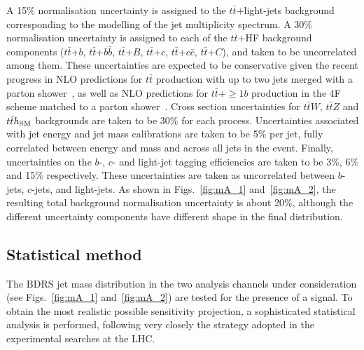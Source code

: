 \documentclass[preprintnumbers,superscriptaddress,nofootinbib,aps,prd,floatfix]{revtex4}
\newcommand{\ttbar}{\ensuremath{t\bar{t}}}
\begin{document}
A 15\% normalisation uncertainty is assigned to the $\ttbar$+light-jets background corresponding to the modelling of the jet multiplicity 
spectrum. A 30\% normalisation uncertainty is assigned to each of the $\ttbar$+HF background components ($\ttbar$+$b$, 
$\ttbar$+$b\bar{b}$, $\ttbar$+$B$, $\ttbar$+$c$, $\ttbar$+$c\bar{c}$, $\ttbar$+$C$), and taken to be uncorrelated among 
them. These uncertainties are expected to be conservative given the recent progress in NLO predictions for $\ttbar$ production with
up to two jets merged with a parton shower~\cite{Hoeche:2014qda}, as well as NLO predictions for $\ttbar$+$\geq 1b$ production 
in the 4F scheme matched to a parton shower~\cite{Cascioli:2013era}. Cross section uncertainties for $\ttbar W$, $\ttbar Z$ and
$\ttbar h_{\rm SM}$ backgrounds are taken to be 30\% for each process. Uncertainties associated with jet energy and jet mass calibrations are taken
to be 5\% per jet, fully correlated between energy and mass and across all jets in the event. Finally, uncertainties on the
$b$-, $c$- and light-jet tagging efficiencies are taken to be 3\%, 6\% and 15\% respectively. These uncertainties are taken 
as uncorrelated between $b$-jets, $c$-jets, and light-jets. 
As shown in Figs.~\ref{fig:mA_1} and~\ref{fig:mA_2}, the resulting total background normalisation uncertainty is about 20\%, 
although the different uncertainty components have different shape in the final distribution.

\subsection{Statistical method}
\label{sec:stat_analysis}

The BDRS jet mass distribution in the two analysis channels 
under consideration (see Figs.~\ref{fig:mA_1} and~\ref{fig:mA_2}) are tested for the presence of
a signal. To obtain the most realistic possible sensitivity projection, a sophisticated statistical analysis   
is performed, following very closely the strategy adopted in the experimental searches at the LHC.
\end{document}
